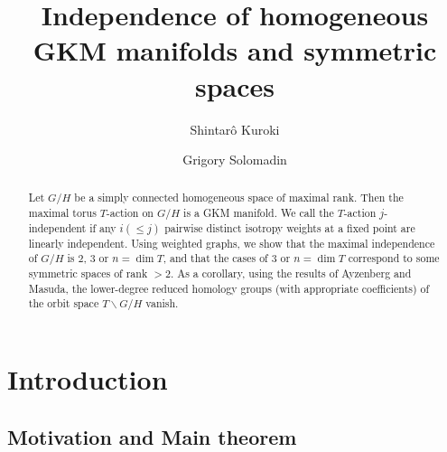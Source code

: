 \documentclass{amsart}
\theoremstyle{definition}
\theoremstyle{remark}
\numberwithin{equation}{section}
\begin{document}
\title[Independence and symmetric spaces]{Independence of homogeneous GKM manifolds and symmetric spaces}

\author[S.\ Kuroki]{Shintar\^o Kuroki}
\address{Department of Applied Mathematics Faculty of Science, Okayama University of Science, 1-1 Ridai-Cho Kita-Ku Okayama-shi Okayama 700-0005, Okayama, Japan}

\author{Grigory Solomadin}
\address[G.\,Solomadin]{Philipps-Universit\"at Marburg, Germany}

\begin{abstract}
Let $G/H$ be a simply connected homogeneous space of maximal rank. 
Then the maximal torus $T$-action on $G/H$ is a GKM manifold.
We call the $T$-action $j$-independent if any $i(\leq j)$ pairwise distinct isotropy weights at a fixed point are linearly independent.
Using weighted graphs, we show that the maximal independence of $G/H$ is $2$, $3$ or $n=\dim T$, and that the cases of $3$ or $n=\dim T$ correspond to some symmetric spaces of rank $>2$.
As a corollary, 
using the results of Ayzenberg and Masuda, the lower-degree reduced homology groups (with appropriate coefficients) of the orbit space $T\backslash G/H$ vanish.
\end{abstract}



\maketitle

\section{Introduction}
\label{sect:1}

\subsection{Motivation and Main theorem}
\label{sect:1.1}
\end{document}
